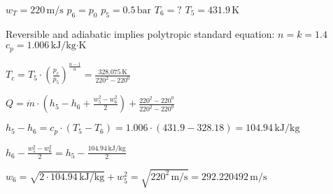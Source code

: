 \( w_T = 220 \, \text{m/s} \)  
\( p_6 = p_0 \)  
\( p_5 = 0.5 \, \text{bar} \)  
\( T_6 = ? \)  
\( T_5 = 431.9 \, \text{K} \)  

Reversible and adiabatic implies polytropic standard equation:  
\( n = k = 1.4 \)  
\( c_p = 1.006 \, \text{kJ/kg·K} \)  

\( T_c = T_5 \cdot \left( \frac{p_c}{p_5} \right)^{\frac{n-1}{n}} = \frac{328.075 \, \text{K}}{220^2 - 220^0} \)  

\( Q = \dot{m} \cdot \left( h_5 - h_6 + \frac{w_5^2 - w_6^2}{2} \right) + \frac{220^2 - 220^0}{220^2 - 220^0} \)  

\( h_5 - h_6 = c_p \cdot (T_5 - T_6) = 1.006 \cdot (431.9 - 328.18) = 104.94 \, \text{kJ/kg} \)  

\( h_6 - \frac{w_5^2 - w_6^2}{2} = h_5 - \frac{104.94 \, \text{kJ/kg}}{2} \)  

\( w_6 = \sqrt{2 \cdot 104.94 \, \text{kJ/kg}} + w_5^2 = \sqrt{220^2 \, \text{m/s}} = 292.220492 \, \text{m/s} \)